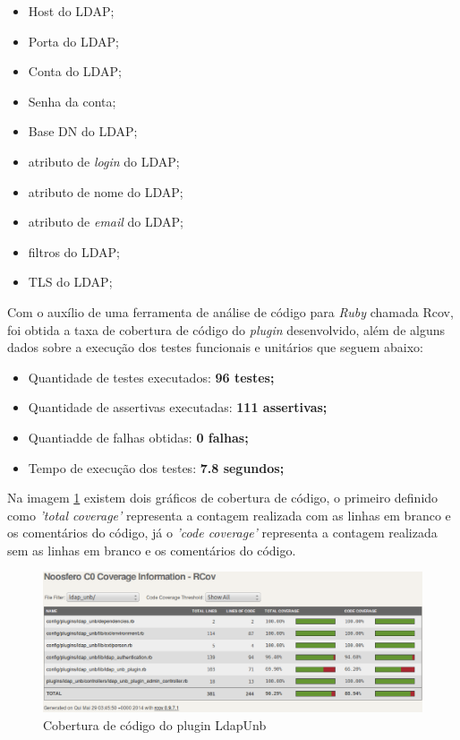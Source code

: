 \begin{itemize}
\item Host do LDAP;
\item Porta do LDAP;
\item Conta do LDAP;
\item Senha da conta;
\item Base DN do LDAP;
\item atributo de \textit{login} do LDAP;
\item atributo de nome do LDAP;
\item atributo de \textit{email} do LDAP;
\item filtros do LDAP;
\item TLS do LDAP;
\end{itemize}

 Com o auxílio de uma ferramenta de análise de código para \textit{Ruby} chamada Rcov, foi obtida a taxa de cobertura de código do \textit{plugin} desenvolvido, além de alguns dados sobre a execução dos testes funcionais e unitários que seguem abaixo:

\begin{itemize}
\item Quantidade de testes executados: \textbf{96 testes;}
\item Quantidade de assertivas executadas: \textbf{111 assertivas;}
\item Quantiadde de falhas obtidas: \textbf{0 falhas;}
\item Tempo de execução dos testes: \textbf{7.8 segundos;}
\end{itemize}

Na imagem \ref{consideracoes_cobertura1} existem dois gráficos de cobertura de código, o primeiro definido como \textit{'total coverage'} representa a contagem realizada com as linhas em branco e os comentários do código, já o \textit{'code coverage'} representa a contagem realizada sem as linhas em branco e os comentários do código.


\begin{figure}[!h]
    \centering
    \includegraphics[keepaspectratio=false,scale=0.45]
      {figuras/cobertura_teste.eps}
    \caption{Cobertura de código do plugin LdapUnb}
    \label{consideracoes_cobertura1}
\end{figure}


